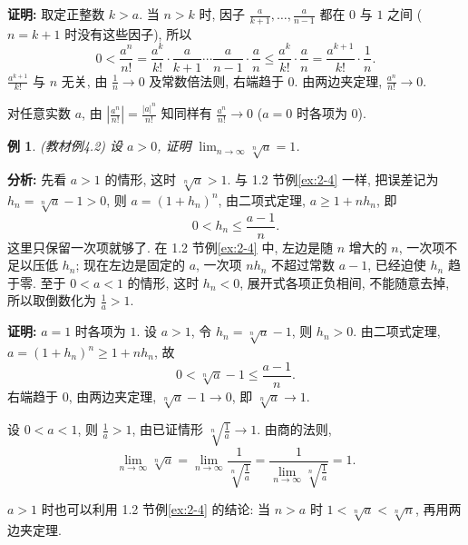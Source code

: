 \documentclass[UTF8,openany]{ctexbook}
\theoremstyle{chinesetextbook}
\newtheorem{example}{例}[section]
\newenvironment{cnproof}{\par\indent\textbf{证明:} \ignorespaces}{\par}
\begin{document}
\begin{cnproof}
取定正整数 $k>a$. 当 $n>k$ 时, 因子 $\displaystyle\frac a{k+1},\ldots,\frac a{n-1}$ 都在 $0$ 与 $1$ 之间 ($n=k+1$ 时没有这些因子), 所以
\[
0<\frac{a^n}{n!}=\frac{a^k}{k!}\cdot\frac a{k+1}\cdots\frac a{n-1}\cdot\frac an\le\frac{a^k}{k!}\cdot\frac an=\frac{a^{k+1}}{k!}\cdot\frac1n.
\]
$\displaystyle\frac{a^{k+1}}{k!}$ 与 $n$ 无关, 由 $\displaystyle\frac1n\to0$ 及常数倍法则, 右端趋于 $0$. 由两边夹定理, $\displaystyle\frac{a^n}{n!}\to0$.
\end{cnproof}
对任意实数 $a$, 由 $\displaystyle\left|\frac{a^n}{n!}\right|=\frac{|a|^n}{n!}$ 知同样有 $\displaystyle\frac{a^n}{n!}\to0$ ($a=0$ 时各项为 $0$).
\begin{example}\label{ex:4-2}
\textnormal{(教材例4.2)} 设 $a>0$, 证明 $\displaystyle\lim_{n\to\infty}\sqrt[n]a=1$.
\end{example}
\par\indent\textbf{分析:} 先看 $a>1$ 的情形, 这时 $\sqrt[n]a>1$. 与 1.2 节例\ref{ex:2-4} 一样, 把误差记为 $h_n=\sqrt[n]a-1>0$, 则 $a=(1+h_n)^n$, 由二项式定理, $a\ge1+nh_n$, 即
\[
0<h_n\le\frac{a-1}n.
\]
这里只保留一次项就够了. 在 1.2 节例\ref{ex:2-4} 中, 左边是随 $n$ 增大的 $n$, 一次项不足以压低 $h_n$; 现在左边是固定的 $a$, 一次项 $nh_n$ 不超过常数 $a-1$, 已经迫使 $h_n$ 趋于零. 至于 $0<a<1$ 的情形, 这时 $h_n<0$, 展开式各项正负相间, 不能随意去掉, 所以取倒数化为 $\displaystyle\frac1a>1$.
\begin{cnproof}
$a=1$ 时各项为 $1$. 设 $a>1$, 令 $h_n=\sqrt[n]a-1$, 则 $h_n>0$. 由二项式定理, $a=(1+h_n)^n\ge1+nh_n$, 故
\[
0<\sqrt[n]a-1\le\frac{a-1}n.
\]
右端趋于 $0$, 由两边夹定理, $\sqrt[n]a-1\to0$, 即 $\sqrt[n]a\to1$.

设 $0<a<1$, 则 $\displaystyle\frac1a>1$, 由已证情形 $\displaystyle\sqrt[n]{\frac1a}\to1$. 由商的法则,
\[
\lim_{n\to\infty}\sqrt[n]a=\lim_{n\to\infty}\frac1{\sqrt[n]{\frac1a}}=\frac1{\displaystyle\lim_{n\to\infty}\sqrt[n]{\frac1a}}=1.
\]
\end{cnproof}
$a>1$ 时也可以利用 1.2 节例\ref{ex:2-4} 的结论: 当 $n>a$ 时 $1<\sqrt[n]a<\sqrt[n]n$, 再用两边夹定理.
\end{document}
